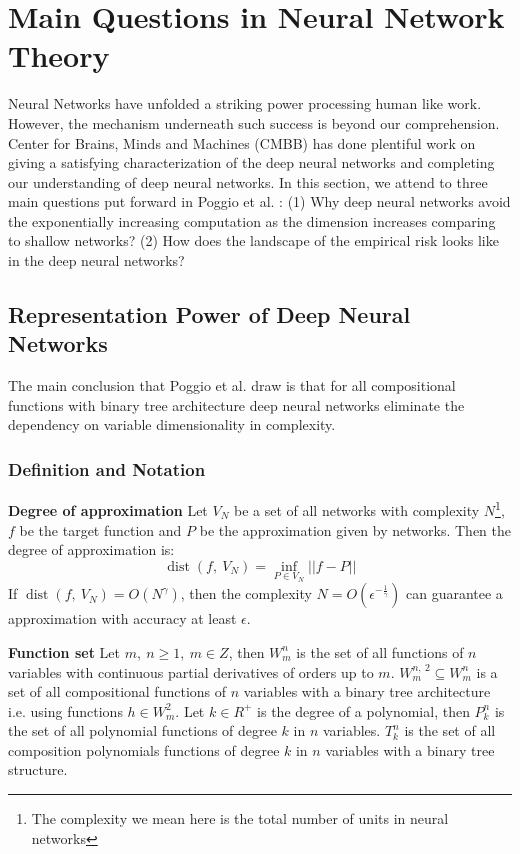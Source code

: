 \section{Main Questions in Neural Network Theory}
\label{sec:Question}
Neural Networks have unfolded a striking power processing human like
work. However, the mechanism underneath such success is beyond our 
comprehension. Center for Brains, Minds and Machines (CMBB) has done
plentiful work on giving a satisfying characterization of the deep 
neural networks and completing our understanding of deep neural networks.
In this section, we attend to three main questions put forward 
in Poggio et al. \parencite{poggio2016theory,poggio2017theory,
banburski2019theory}: (1) Why deep neural networks avoid the 
exponentially increasing computation
as the dimension increases comparing to shallow networks? 
(2) How does the landscape of the empirical risk looks like in 
the deep neural networks?


\subsection{Representation Power of Deep Neural Networks}
The main conclusion that Poggio et al. \parencite{poggio2016theory} 
draw is that for all compositional functions with binary tree 
architecture deep neural networks eliminate the dependency on 
variable dimensionality in complexity.

\subsubsection{Definition and Notation}
\textbf{Degree of approximation} Let $ V_N $ be a set of all networks
with complexity $ N $\footnote{The complexity we mean here is the 
total number of units in neural networks}, $ f $ be the target 
function and $ P $ be the approximation given by networks. 
Then the degree of approximation is:
\begin{equation}
    \mathop{\text{dist}}(f,\ V_N) = \mathop{\inf}_{P\in V_N}||f-P||
\end{equation}
If $ \mathop{\text{dist}}(f,\ V_N) = O(N^{\gamma}) $, then the complexity
$ N = O(\epsilon^{-\frac{1}{\gamma}}) $ can guarantee a approximation
with accuracy at least $ \epsilon $.

\textbf{Function set} Let $ m,\ n \geq 1,\ m \in Z $, then $ W_m^n $
is the set of all functions of $ n $ variables with continuous partial
derivatives of orders up to $ m $.
 $ W_m^{n,\ 2} \subseteq W_m^n $ is 
a set of all compositional functions of $ n $ variables with a binary
tree architecture i.e. using functions $ h \in W_m^2 $. 
Let $ k \in R^+ $ is the degree of a polynomial, then $ P_k^n $ is 
the set of all polynomial functions of degree $ k $ in $ n $ variables.
$ T_k^n $ is the set of all composition polynomials functions of degree 
$ k $ in $ n $ variables with a binary tree structure.

